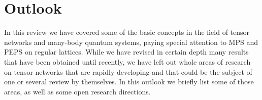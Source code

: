 \documentclass[rmp,aps,reprint,superscriptaddress,nobalancelastpage]{revtex4-1}
\begin{document}
\section{Outlook\label{sec:5-outlook}}

In this review we have covered some of the basic concepts in the field of tensor networks and many-body quantum systems, paying special attention to MPS and PEPS on regular lattices. While we have revised in certain depth many results that have been obtained until recently, we have left out whole areas of research on tensor networks that are rapidly developing and that could be the subject of one or several review by themselves. In this outlook we briefly list some of those areas, as well as some open research directions.
\end{document}

